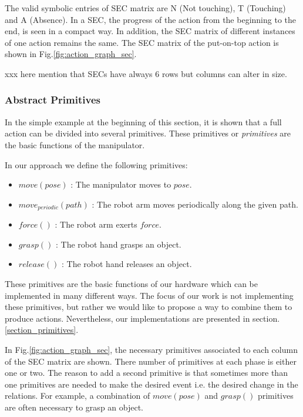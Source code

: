 The valid symbolic entries of SEC matrix are N (Not touching), T (Touching) and A (Absence).
In a SEC, the progress of the action from the beginning to the end, is seen in a compact way.
In addition, the SEC matrix of different instances of one action remains the same.
The SEC matrix of the put-on-top action is shown in Fig.\ref{fig:action_graph_sec}.

xxx here mention that SECs have always 6 rows but columns can alter in size.


\subsubsection{Abstract Primitives}
\label{sec:abstract_primitives}
In the simple example at the beginning of this section, it is shown that a full action can be divided into several primitives.
These primitives or \textit{primitives} are the basic functions of the manipulator.

In our approach we define the following primitives:
\begin{itemize}
 \item $move(pose)$ :  The manipulator moves to $pose$.
 \item $move_{periodic}(path)$ : The robot arm moves periodically along the given path.
 \item $force()$ : The robot arm exerts $force$.
 \item $grasp()$ : The robot hand grasps an object.
 \item $release()$ : The robot hand releases an object.
\end{itemize}


These primitives are the basic functions of our hardware which can be implemented in many different ways.
The focus of our work is not implementing these primitives,
but rather we would like to propose a way to combine them to produce actions.
Nevertheless, our implementations are presented in section.\ref{section_primitives}.

In Fig.\ref{fig:action_graph_sec}, the necessary primitives associated to each column of the SEC matrix are shown.
There number of primitives at each phase is either one or two.
The reason to add a second primitive is that sometimes more than one primitives are needed to make the desired event i.e. the desired change in the relations.
For example, a combination of $move(pose)$ and $grasp()$ primitives are often necessary to grasp an object.

